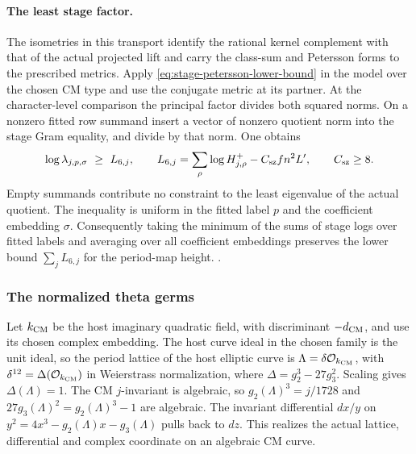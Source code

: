 \paragraph{The least stage factor.}
The isometries in this transport identify the rational kernel
complement with that of the actual projected lift and
carry the class-sum and Petersson forms to the prescribed
metrics. Apply \eqref{eq:stage-petersson-lower-bound} in the
model over the chosen CM type and use the conjugate
metric at its partner. At the character-level comparison
the principal factor divides both squared norms.
On a nonzero fitted row summand insert a vector of nonzero
quotient norm into the stage Gram equality, and divide by
that norm. One obtains
\[
 \log\lambda_{j,p,\sigma}\ \ge\ L_{6,j},\qquad
 L_{6,j}=\sum_\rho\log H^+_{j,\rho}-C_{\rm sz}fn^2L',
 \qquad C_{\rm sz}\ge8 .
\]
Empty summands contribute no constraint to the least
eigenvalue of the actual quotient. The inequality is uniform
in the fitted label \(p\) and the coefficient embedding
\(\sigma\). Consequently taking the minimum of the sums of
stage logs over fitted labels and averaging over all
coefficient embeddings preserves the lower bound
\(\sum_jL_{6,j}\) for the period-map height.
.

\subsubsection{The normalized theta germs}
\label{sec:period-germs}
Let \(k_{\rm CM}\) be the host imaginary quadratic field, with
discriminant \(-d_{\rm CM}\), and use its chosen complex embedding.
The host curve ideal in the chosen family is the unit ideal, so
the period lattice of the host elliptic curve is
\(\Lambda=\delta\mathcal O_{k_{\rm CM}}\), with
\(\delta^{12}=\Delta(\mathcal O_{k_{\rm CM}})\) in Weierstrass
normalization, where \(\Delta=g_2^3-27g_3^2\).
Scaling gives \(\Delta(\Lambda)=1\). The CM \(j\)-invariant
is algebraic, so \(g_2(\Lambda)^3=j/1728\) and
\(27g_3(\Lambda)^2=g_2(\Lambda)^3-1\) are algebraic.
The invariant differential \(dx/y\) on
\(y^2=4x^3-g_2(\Lambda)x-g_3(\Lambda)\) pulls back to \(dz\).
This realizes the actual lattice, differential and
complex coordinate on an algebraic CM curve.

